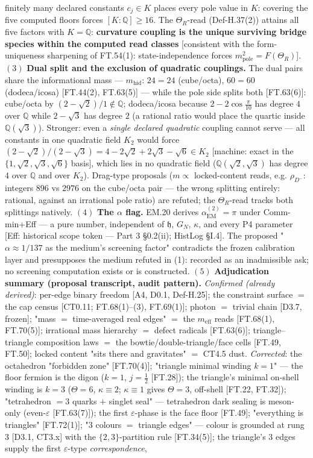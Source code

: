 \documentclass[11pt,openany]{report}
\theoremstyle{canonplain}
\theoremstyle{canondef}
\begin{document}
finitely many declared constants $c_j\in K$ places every pole value in $K$: covering the five computed floors forces $[K:\mathbb Q]\ge16$. The $\Theta_R$-read (Def-H.37(2)) attains all five factors with $K=\mathbb Q$: \textbf{curvature coupling is the unique surviving bridge species within the computed read classes} [consistent with the form-uniqueness sharpening of FT.54(1): state-independence forces $m^2_{\mathrm{pole}}=F(\Theta_R)$]. $(3)$ \textbf{Dual split and the exclusion of quadratic couplings.} The dual pairs share the informational mass — $m_{\mathrm{hid}}$: $24{=}24$ (cube/octa), $60{=}60$ (dodeca/icosa) [FT.44(2), FT.63(5)] — while the pole side splits both [FT.63(6)]: cube/octa by $(2-\sqrt2)/1\notin\mathbb Q$; dodeca/icosa because $2-2\cos\tfrac\pi{10}$ has degree $4$ over $\mathbb Q$ while $2-\sqrt3$ has degree $2$ (a rational ratio would place the quartic inside $\mathbb Q(\sqrt3)$). Stronger: even a \textit{single declared quadratic} coupling cannot serve — all constants in one quadratic field $K_2$ would force $(2-\sqrt2)/(2-\sqrt3)=4-2\sqrt2+2\sqrt3-\sqrt6\in K_2$ [machine: exact in the $\{1,\sqrt2,\sqrt3,\sqrt6\}$ basis], which lies in no quadratic field ($\mathbb Q(\sqrt2,\sqrt3)$ has degree $4$ over $\mathbb Q$ and over $K_2$). Drag-type proposals ($m\propto$ locked-content reads, e.g. $\rho_{D^-}$: integers $896$ vs $2976$ on the cube/octa pair — the wrong splitting entirely: rational, against an irrational pole ratio) are refuted; the $\Theta_R$-read tracks both splittings natively. $(4)$ \textbf{The $\alpha$ flag.} EM.20 derives $\alpha_{\mathrm{EM}}^{(2)}=\pi$ under Comm-min+Eff — a pure number, independent of $\mathfrak h$, $G_N$, $\kappa$, and every P4 parameter [Eff: historical scope token — Part 3 §0.2(ii); HistLog §I.4]. The proposed "$\alpha\approx1/137$ as the medium's screening factor" contradicts the frozen calibration layer and presupposes the medium refuted in (1): recorded as an inadmissible ask; no screening computation exists or is constructed. $(5)$ \textbf{Adjudication summary (proposal transcript, audit pattern).} \textit{Confirmed (already derived)}: per-edge binary freedom [A4, D0.1, Def-H.25]; the constraint surface $=$ the cap census [CT0.11; FT.68(1)–(3), FT.69(1)]; photon $=$ trivial chain [D3.7, frozen]; "mass $=$ time-averaged real edges" $=$ the $m_{\mathrm{eff}}$ reads [FT.68(1), FT.70(5)]; irrational mass hierarchy $=$ defect radicals [FT.63(6)]; triangle–triangle composition laws $=$ the bowtie/double-triangle/face cells [FT.49, FT.50]; locked content "sits there and gravitates" $=$ CT4.5 dust. \textit{Corrected}: the octahedron "forbidden zone" [FT.70(4)]; "triangle minimal winding $k{=}1$" — the floor fermion is the digon ($k{=}1$, $j{=}\tfrac12$ [FT.28]); the triangle's minimal on-shell winding is $k{=}3$ ($\Theta{=}6$, $\kappa{\equiv}2$; $\kappa{\equiv}1$ gives $\Theta{=}3$, off-shell [FT.22, FT.32]); "tetrahedron $=3$ quarks $+$ singlet seal" — tetrahedron dark sealing is meson-only (even-$\varepsilon$ [FT.63(7)]); the first $\varepsilon$-phase is the face floor [FT.49]; "everything is triangles" [FT.72(1)]; "$3$ colours $=$ triangle edges" — colour is grounded at rung $3$ [D3.1, CT3.x] with the $\{2,3\}$-partition rule [FT.34(5)]; the triangle's $3$ edges supply the first $\varepsilon$-type \textit{correspondence}, 
\end{document}
